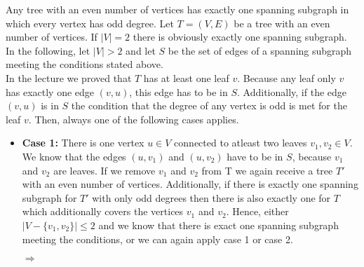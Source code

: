 \documentclass[a4paper]{article}
\begin{document}
\begin{solution}{6}
		\begin{theorem}{Any tree with an even number of vertices has exactly one spanning subgraph in which every vertex has odd degree.}
			Let $T=(V, E)$ be a tree with an even number of vertices. If $|V|=2$ there is obviously exactly one spanning subgraph. 
			In the following, let $|V|>2$ and let $S$ be the set of edges of a spanning subgraph meeting the conditions stated above. \\
			In the lecture we proved that $T$ has at least one leaf $v$. 
			Because any leaf only $v$ has exactly one edge $(v,u)$, this edge has to be in $S$. 
			Additionally, if the edge $(v,u)$ is in $S$ the condition that the degree of any vertex is odd is met for the leaf $v$. 
			Then, always one of the following cases applies. 
			\begin{itemize}
				\item \textbf{Case 1:} There is one vertex $u \in V$ connected to atleast two leaves $v_1, v_2 \in V$. \\
				We know that the edges $(u,v_1)$ and $(u,v_2)$ have to be in $S$, because $v_1$ and $v_2$ are leaves. 
				If we remove $v_1$ and $v_2$ from T we again receive a tree $T'$ with an even number of vertices. 
				Additionally, if there is exactly one spanning subgraph for $T'$ with only odd degrees then there is also exactly one for $T$ which additionally covers the vertices $v_1$ and $v_2$. 
				Hence, either $|V- \{v_1,v_2\}| \leq 2$ and we know that there is exact one spanning subgraph meeting the conditions, or we can again apply case 1 or case 2. 
				
				\begin{center}
				 $\Rightarrow$
			\end{center}
			

\end{itemize}
\end{theorem}
\end{solution}
\end{document}
